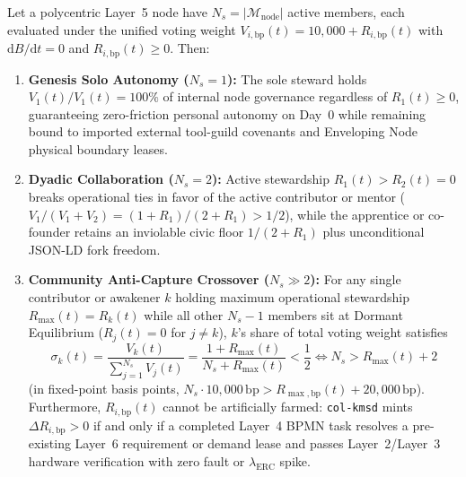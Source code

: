 \begin{theorem}
\label{thm:dormant-hijack-immunity}
Let a polycentric Layer~5 node have $N_s = |\mathcal{M}_{\mathrm{node}}|$ active members, each evaluated under the
unified voting weight $V_{i,\mathrm{bp}}(t) = 10{,}000 + R_{i,\mathrm{bp}}(t)$ with $\mathrm{d}B/\mathrm{d}t = 0$ and
$R_{i,\mathrm{bp}}(t) \ge 0$. Then:
\begin{enumerate}
    \item \textbf{Genesis Solo Autonomy ($N_s = 1$):} The sole steward holds $V_1(t)/V_1(t) = 100\%$ of internal node
    governance regardless of $R_1(t) \ge 0$, guaranteeing zero-friction personal autonomy on Day~0 while remaining
    bound to imported external tool-guild covenants and Enveloping Node physical boundary leases.
    \item \textbf{Dyadic Collaboration ($N_s = 2$):} Active stewardship $R_1(t) > R_2(t) = 0$ breaks operational ties
    in favor of the active contributor or mentor ($V_1 / (V_1 + V_2) = (1 + R_1)/(2 + R_1) > 1/2$), while the
    apprentice or co-founder retains an inviolable civic floor $1/(2 + R_1)$ plus unconditional JSON-LD fork freedom.
    \item \textbf{Community Anti-Capture Crossover ($N_s \gg 2$):} For any single contributor or awakener $k$ holding
    maximum operational stewardship $R_{\max}(t) = R_k(t)$ while all other $N_s - 1$ members sit at Dormant Equilibrium
    ($R_j(t) = 0$ for $j \ne k$), $k$'s share of total voting weight satisfies
    \begin{equation}
        \sigma_k(t) = \frac{V_k(t)}{\sum_{j=1}^{N_s} V_j(t)} = \frac{1 + R_{\max}(t)}{N_s + R_{\max}(t)} < \frac{1}{2} \iff N_s > R_{\max}(t) + 2
        \label{eq:anti-capture-crossover}
    \end{equation}
    (in fixed-point basis points, $N_s \cdot 10{,}000\,\mathrm{bp} > R_{\max,\mathrm{bp}}(t) + 20{,}000\,\mathrm{bp}$).
    Furthermore, $R_{i,\mathrm{bp}}(t)$ cannot be artificially farmed: \texttt{col-kmsd} mints $\Delta R_{i,\mathrm{bp}} > 0$
    if and only if a completed Layer~4 BPMN task resolves a pre-existing Layer~6 requirement or demand lease and passes
    Layer~2/Layer~3 hardware verification with zero fault or $\lambda_{\mathrm{ERC}}$ spike.
\end{enumerate}
\end{theorem}

